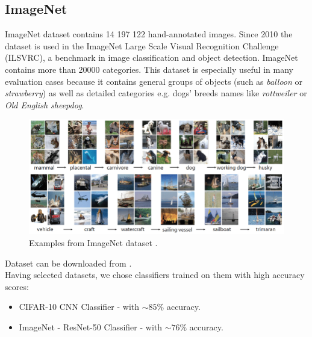 \documentclass[12pt,a4paper,openany]{book}
\begin{document}
\subsection*{ImageNet} 
\noindent ImageNet dataset contains 14 197 122 hand-annotated images. Since 2010 the dataset is used in the ImageNet Large Scale Visual Recognition Challenge (ILSVRC), a benchmark in image classification and object detection.  ImageNet contains more than 20000 categories. This dataset is especially useful in many evaluation cases because it contains general groups of objects (such as \textit{balloon} or \textit{strawberry}) as well as detailed categories e.g. dogs' breeds names like \textit{rottweiler} or \textit{Old English sheepdog}.
\begin{figure}[H]
    \centering
    \includegraphics[scale=0.5]{figs/imagenet.png}
    \caption{Examples from ImageNet dataset \cite{imagenet_example}.}
\end{figure}
\noindent Dataset can be downloaded from \cite{imagenet_data}. \\
\noindent Having selected datasets, we chose classifiers trained on them with high accuracy scores:\\
\begin{itemize}
\item CIFAR-10 CNN Classifier \cite{cifar10_classifier} - with $ \sim 85\% $ accuracy.
\item ImageNet - ResNet-50 Classifier \cite{resnet} -  with $ \sim 76\% $ accuracy. 
\end{itemize}
\end{document}
